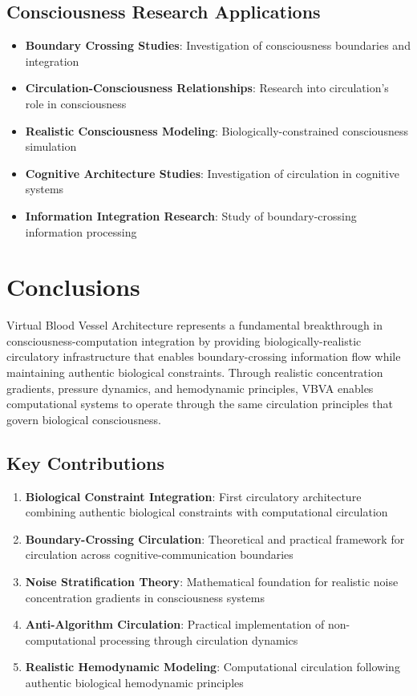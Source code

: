\documentclass[12pt,a4paper]{article}
\begin{document}
\subsection{Consciousness Research Applications}

\begin{itemize}
\item \textbf{Boundary Crossing Studies}: Investigation of consciousness boundaries and integration
\item \textbf{Circulation-Consciousness Relationships}: Research into circulation's role in consciousness
\item \textbf{Realistic Consciousness Modeling}: Biologically-constrained consciousness simulation
\item \textbf{Cognitive Architecture Studies}: Investigation of circulation in cognitive systems
\item \textbf{Information Integration Research}: Study of boundary-crossing information processing
\end{itemize}

\section{Conclusions}

Virtual Blood Vessel Architecture represents a fundamental breakthrough in consciousness-computation integration by providing biologically-realistic circulatory infrastructure that enables boundary-crossing information flow while maintaining authentic biological constraints. Through realistic concentration gradients, pressure dynamics, and hemodynamic principles, VBVA enables computational systems to operate through the same circulation principles that govern biological consciousness.

\subsection{Key Contributions}

\begin{enumerate}
\item \textbf{Biological Constraint Integration}: First circulatory architecture combining authentic biological constraints with computational circulation
\item \textbf{Boundary-Crossing Circulation}: Theoretical and practical framework for circulation across cognitive-communication boundaries  
\item \textbf{Noise Stratification Theory}: Mathematical foundation for realistic noise concentration gradients in consciousness systems
\item \textbf{Anti-Algorithm Circulation}: Practical implementation of non-computational processing through circulation dynamics
\item \textbf{Realistic Hemodynamic Modeling}: Computational circulation following authentic biological hemodynamic principles
\end{enumerate}
\end{document}

